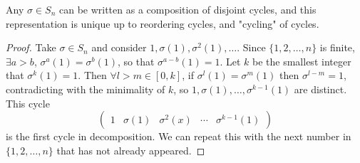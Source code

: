 \documentclass[10pt]{article}
\begin{document}
    \begin{theorem}\label{thm:disjoint cycle decomp}
        Any $ \sigma\in S_n $ can be written as a composition of disjoint cycles, and this representation is unique up to reordering cycles, and "cycling" of cycles.
    \end{theorem}
    \begin{proof}
        Take $ \sigma\in S_n $ and consider $ 1,\sigma(1),\sigma^2(1),\dots $. Since $ \{1,2,\dots,n\} $ is finite, $ \exists a>b $, $ \sigma^a(1)=\sigma^b(1) $, so that $ \sigma^{a-b}(1)=1 $. Let $k$ be the smallest integer that $ \sigma^{k}(1)=1 $. Then $ \forall l>m\in [0,k] $, if $ \sigma^{l}(1)=\sigma^{m}(1) $ then $ \sigma^{l-m}=1 $, contradicting with the minimality of $k$, so $ 1,\sigma(1),\dots,\sigma^{k-1}(1) $ are distinct. This cycle 
        \[
            \begin{pmatrix}
                1&\sigma(1)&\sigma^2(x)&\cdots&\sigma^{k-1}(1)
            \end{pmatrix}
        \]
        is the first cycle in decomposition. We can repeat this with the next number in $\{1,2,\dots,n\}$ that has not already appeared.


\end{proof}
\end{document}
